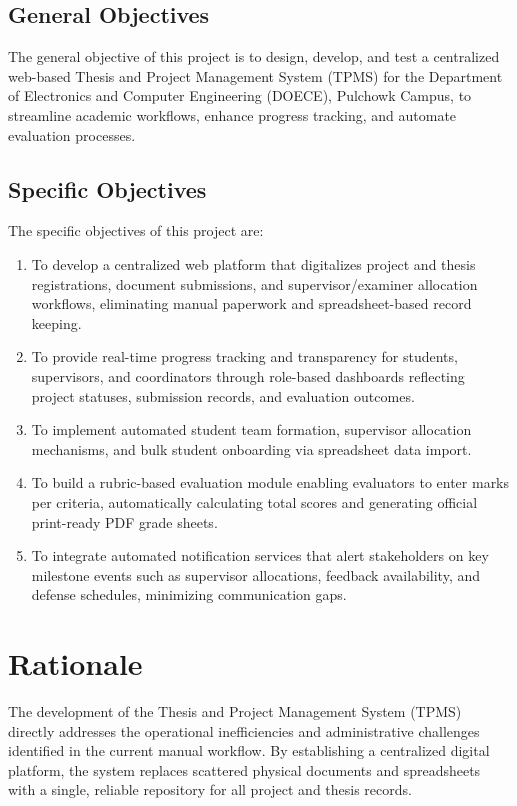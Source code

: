 \subsection{General Objectives}
The general objective of this project is to design, develop, and test a centralized web-based Thesis and Project Management System (TPMS) for the Department of Electronics and Computer Engineering (DOECE), Pulchowk Campus, to streamline academic workflows, enhance progress tracking, and automate evaluation processes.

\subsection{Specific Objectives}
The specific objectives of this project are:
\begin{enumerate}
  \item To develop a centralized web platform that digitalizes project and thesis registrations, document submissions, and supervisor/examiner allocation workflows, eliminating manual paperwork and spreadsheet-based record keeping.
  
  \item To provide real-time progress tracking and transparency for students, supervisors, and coordinators through role-based dashboards reflecting project statuses, submission records, and evaluation outcomes.
  
  \item To implement automated student team formation, supervisor allocation mechanisms, and bulk student onboarding via spreadsheet data import.
  
  \item To build a rubric-based evaluation module enabling evaluators to enter marks per criteria, automatically calculating total scores and generating official print-ready PDF grade sheets.
  
  \item To integrate automated notification services that alert stakeholders on key milestone events such as supervisor allocations, feedback availability, and defense schedules, minimizing communication gaps.
\end{enumerate}

\section{Rationale}
The development of the Thesis and Project Management System (TPMS) directly addresses the operational inefficiencies and administrative challenges identified in the current manual workflow. By establishing a centralized digital platform, the system replaces scattered physical documents and spreadsheets with a single, reliable repository for all project and thesis records.

